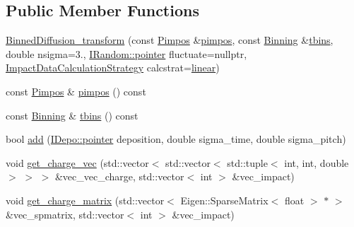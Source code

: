 \subsection*{Public Member Functions}
\begin{DoxyCompactItemize}
\item 
\hyperlink{class_wire_cell_1_1_gen_1_1_binned_diffusion__transform_a73d5b050771927475423f0aa17369b46}{Binned\+Diffusion\+\_\+transform} (const \hyperlink{class_wire_cell_1_1_pimpos}{Pimpos} \&\hyperlink{class_wire_cell_1_1_gen_1_1_binned_diffusion__transform_a5da47771953721da39a78625d1845363}{pimpos}, const \hyperlink{class_wire_cell_1_1_binning}{Binning} \&\hyperlink{class_wire_cell_1_1_gen_1_1_binned_diffusion__transform_a57f26ea414abfae84cf54bdbe7992db5}{tbins}, double nsigma=3., \hyperlink{class_wire_cell_1_1_interface_a09c548fb8266cfa39afb2e74a4615c37}{I\+Random\+::pointer} fluctuate=nullptr, \hyperlink{class_wire_cell_1_1_gen_1_1_binned_diffusion__transform_af412f1b73b13a90b066cb7284735ddf8}{Impact\+Data\+Calculation\+Strategy} calcstrat=\hyperlink{class_wire_cell_1_1_gen_1_1_binned_diffusion__transform_af412f1b73b13a90b066cb7284735ddf8aaac1a1f642137ad29456e098e82c7b6e}{linear})
\item 
const \hyperlink{class_wire_cell_1_1_pimpos}{Pimpos} \& \hyperlink{class_wire_cell_1_1_gen_1_1_binned_diffusion__transform_a5da47771953721da39a78625d1845363}{pimpos} () const
\item 
const \hyperlink{class_wire_cell_1_1_binning}{Binning} \& \hyperlink{class_wire_cell_1_1_gen_1_1_binned_diffusion__transform_a57f26ea414abfae84cf54bdbe7992db5}{tbins} () const
\item 
bool \hyperlink{class_wire_cell_1_1_gen_1_1_binned_diffusion__transform_a18fd9a41fa313057caf57a8aa9957c86}{add} (\hyperlink{class_wire_cell_1_1_i_data_aff870b3ae8333cf9265941eef62498bc}{I\+Depo\+::pointer} deposition, double sigma\+\_\+time, double sigma\+\_\+pitch)
\item 
void \hyperlink{class_wire_cell_1_1_gen_1_1_binned_diffusion__transform_acb9922e051d067601b96fa03e80445bc}{get\+\_\+charge\+\_\+vec} (std\+::vector$<$ std\+::vector$<$ std\+::tuple$<$ int, int, double $>$ $>$ $>$ \&vec\+\_\+vec\+\_\+charge, std\+::vector$<$ int $>$ \&vec\+\_\+impact)
\item 
void \hyperlink{class_wire_cell_1_1_gen_1_1_binned_diffusion__transform_a7baeb40d106e11019f0cf96917a59d18}{get\+\_\+charge\+\_\+matrix} (std\+::vector$<$ Eigen\+::\+Sparse\+Matrix$<$ float $>$ $\ast$ $>$ \&vec\+\_\+spmatrix, std\+::vector$<$ int $>$ \&vec\+\_\+impact)

\end{DoxyCompactItemize}

